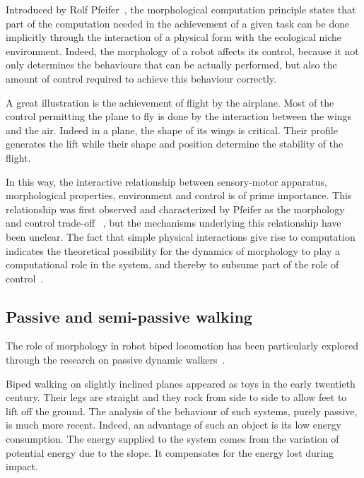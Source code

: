 Introduced by Rolf Pfeifer~\parencite{pfeifer2005morphological}, the morphological computation principle states that part of the computation needed in the achievement of a given task can be done implicitly through the interaction of a physical form with the ecological niche environment.
Indeed, the morphology of a robot affects its control, because it not only determines the behaviours that can be actually performed, but also the amount of control required to achieve this behaviour correctly.

A great illustration is the achievement of flight by the airplane. Most of the control permitting the plane to fly is done by the interaction between the wings and the air. Indeed in a plane, the shape of its wings is critical. Their profile generates the lift while their shape and position determine the stability of the flight.

In this way, the interactive relationship between sensory-motor apparatus, morphological properties, environment and control is of prime importance. This relationship was first observed and characterized by Pfeifer as the morphology and control trade-off ~\parencite{pfeifer2001understanding}, but the mechanisms underlying this relationship have been unclear. The fact that simple physical interactions give rise to computation indicates the theoretical possibility for the dynamics of morphology to play a computational role in the system, and thereby to subsume part of the role of control~\parencite{paulinvestigation}.


\subsection{Passive and semi-passive walking} %
\label{sub:passive_principle}

The role of morphology in robot biped locomotion has been particularly explored through the research on passive dynamic walkers~\parencite{wisse2007passive}.

Biped walking on slightly inclined planes appeared as toys in the early twentieth century. Their legs are straight and they rock from side to side to allow feet to lift off the ground. The analysis of the behaviour of such systems, purely passive, is much more recent. Indeed, an advantage of such an object is its low energy consumption. The energy supplied to the system comes from the variation of potential energy due to the slope. It compensates for the energy lost during impact.

